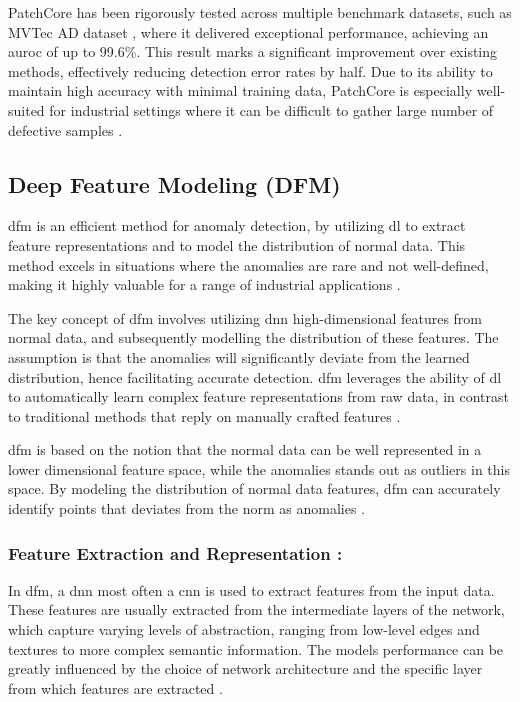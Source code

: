 PatchCore has been rigorously tested across multiple benchmark datasets, such as MVTec AD dataset \cite{8954181}, where it delivered exceptional performance, achieving an \gls{auroc} of up to 99.6\%. This result marks a significant improvement over existing methods, effectively reducing detection error rates by half. Due to its ability to maintain high accuracy with minimal training data, PatchCore is especially well-suited for industrial settings where it can be difficult to gather large number of defective samples \cite{roth2022totalrecallindustrialanomaly}.

\subsection{Deep Feature Modeling (DFM)}
\label{subsec:dfm}

\gls{dfm} is an efficient method for anomaly detection, by utilizing \gls{dl} to extract feature representations and to model the distribution of normal data. This method excels in situations where the anomalies are rare and not well-defined, making it highly valuable for a range of industrial applications \cite{ahuja2019probabilisticmodelingdeepfeatures}.

The key concept of \gls{dfm} involves utilizing \gls{dnn} high-dimensional features from normal data, and subsequently modelling the distribution of these features. The assumption is that the anomalies will significantly deviate from the learned distribution, hence facilitating accurate detection. \gls{dfm} leverages the ability of \gls{dl} to automatically learn complex feature representations from raw data, in contrast to traditional methods that reply on manually crafted features \cite{ahuja2019probabilisticmodelingdeepfeatures}.

\gls{dfm} is based on the notion that the normal data can be well represented in a lower dimensional feature space, while the anomalies stands out as outliers in this space. By modeling the distribution of normal data features, \gls{dfm} can accurately identify points that deviates from the norm as anomalies \cite{ahuja2019probabilisticmodelingdeepfeatures}.

\subsubsection*{Feature Extraction and Representation :}

In \gls{dfm}, a \gls{dnn} most often a \gls{cnn} is used to extract features from the input data. These features are usually extracted from the intermediate layers of the network, which capture varying levels of abstraction, ranging from low-level edges and textures to more complex semantic information. The models performance can be greatly influenced by the choice of network architecture and the specific layer from which features are extracted \cite{8954181}.

